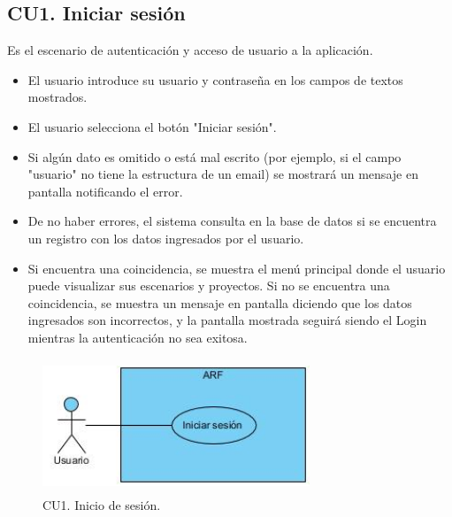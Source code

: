 \subsection{CU1. Iniciar sesión}\par
Es el escenario de autenticación y acceso de usuario a la aplicación. 
\begin{itemize}
	\item El usuario introduce su usuario y contraseña en los campos de textos mostrados.
	\item El usuario selecciona el botón "Iniciar sesión".
	\item Si algún dato es omitido o está mal escrito (por ejemplo, si el campo "usuario" no tiene la estructura de un email) se mostrará un mensaje en pantalla notificando el error.
	\item De no haber errores, el sistema consulta en la base de datos si se encuentra un registro con los datos ingresados por el usuario.
	\item Si encuentra una coincidencia, se muestra el menú principal donde el usuario puede visualizar sus escenarios y proyectos. Si no se encuentra una coincidencia, se muestra un mensaje en pantalla diciendo que los datos ingresados son incorrectos, y la pantalla mostrada seguirá siendo el Login mientras la autenticación no sea exitosa.
\end{itemize}

\begin{figure}[h!]
	\centering
	\includegraphics[width=8cm,height=4cm]{imagenes/analisis/cu/iniciar_sesion.jpg}
	\caption{CU1. Inicio de sesión.}
	\label{fig:iniciosesion}
\end{figure} 

